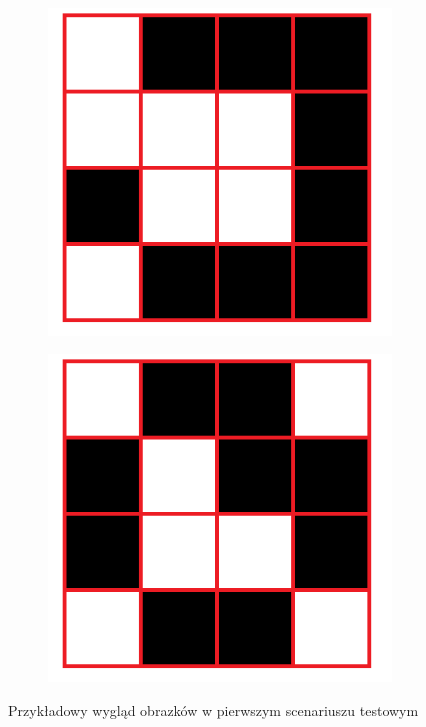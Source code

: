 \documentclass[a4paper, titleauthor]{mwart}
\begin{document}
\begin{figure}[htbp]
\begin{subfigure}{0,3\textwidth}
  \includegraphics[width=\linewidth]{X.png}
  \label{fig:sub2}
\end{subfigure}
\begin{subfigure}{0,3\textwidth}
  \centering
  \includegraphics[width=\linewidth]{X1.png}
  \label{fig:sub3}
\end{subfigure}
\caption{Przykładowy wygląd obrazków w pierwszym scenariuszu testowym}
\label{fig:fig}
\end{figure}
\end{document}
